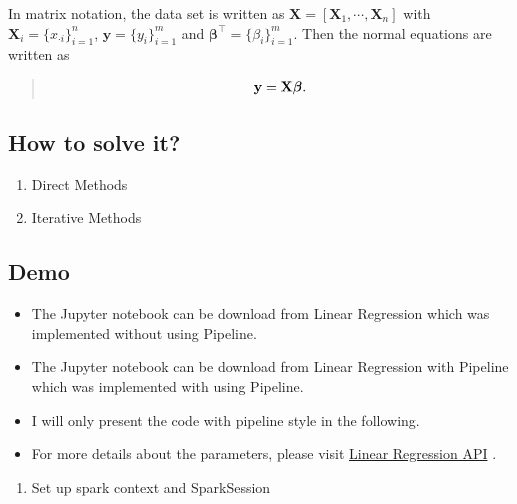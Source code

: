 \documentclass[letterpaper,11pt,english]{sphinxmanual}
\def\X{\mathbf{X}}
\def\By{\mathbf{y}}
\def\Bbeta{\boldsymbol{\beta}}
\begin{document}
In matrix notation, the data set is written as \(\X = [\X_1,\cdots, \X_n]\) with
\(\X_i = {\displaystyle \{x_{\cdot i}\}_{i=1}^{n}}\),
\(\By = {\displaystyle \{y_{i}\}_{i=1}^{m}}\)
and \(\Bbeta^\top = {\displaystyle \{\beta_{i}\}_{i=1}^{m}}\).
Then the normal equations are written as
\begin{quote}
\begin{gather}
\begin{split}\By = \X \Bbeta.\end{split}\notag
\end{gather}\end{quote}


\subsection{How to solve it?}
\label{regression:how-to-solve-it}\begin{enumerate}
\item {} 
Direct Methods

\item {} 
Iterative Methods

\end{enumerate}


\subsection{Demo}
\label{regression:demo}\begin{itemize}
\item {} 
The Jupyter notebook can be download from Linear Regression which was implemented without using Pipeline.

\item {} 
The Jupyter notebook can be download from Linear Regression with Pipeline which was implemented with using Pipeline.

\item {} 
I will only present the code with pipeline style in the following.

\item {} 
For more details about the parameters, please visit \href{http://takwatanabe.me/pyspark/generated/generated/ml.regression.LinearRegression.html}{Linear Regression API} .

\end{itemize}
\begin{enumerate}
\item {} 
Set up spark context and SparkSession

\end{enumerate}
\end{document}
